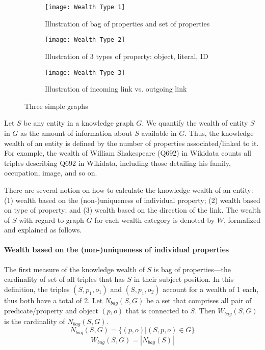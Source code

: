 \begin{figure}
     \centering
     \begin{subfigure}[b]{0.3\textwidth}
         \centering
         \texttt{[image: Wealth Type 1]}
         \caption{Illustration of bag of properties and set of properties}
         \label{fig:wealth-type1}
     \end{subfigure}
     \hfill
     \begin{subfigure}[b]{0.3\textwidth}
         \centering
         \texttt{[image: Wealth Type 2]}
         \caption{Illustration of 3 types of property: object, literal, ID}
         \label{fig:wealth-type2}
     \end{subfigure}
     \hfill
     \begin{subfigure}[b]{0.3\textwidth}
         \centering
         \texttt{[image: Wealth Type 3]}
         \caption{Illustration of incoming link vs. outgoing link}
         \label{fig:wealth-type3}
     \end{subfigure}
     \caption{Three simple graphs}
     \label{fig:three graphs}
\end{figure}

Let \(S\) be any entity in a knowledge graph \(G\). We quantify the wealth of entity \(S\) in \(G\) as the amount of information about \(S\) available in \(G\). Thus, the knowledge wealth of an entity is defined by the number of properties associated/linked to it. For example, the wealth of William Shakespeare (Q692) in Wikidata counts all triples describing Q692 in Wikidata, including those detailing his family, occupation, image, and so on.

There are several notion on how to calculate the knowledge wealth of an entity: (1) wealth based on the (non-)uniqueness of individual property; (2) wealth based on type of property; and (3) wealth based on the direction of the link. The wealth of \(S\) with regard to graph \(G\) for each wealth category is denoted by \(W\), formalized and explained as follows.

\paragraph{Wealth based on the (non-)uniqueness of individual properties}
The first measure of the knowledge wealth of \(S\) is bag of properties---the cardinality of set of all triples that has \(S\) in their subject position. In this definition, the triples \((S, p_1, o_1)\) and \((S, p_1, o_2)\) account for a wealth of 1 each, thus both have a total of 2.
Let \(N_{bag}(S,G)\) be a set that comprises all pair of predicate/property and object \((p,o)\) that is connected to \(S\). Then \(W_{bag}(S, G)\) is the cardinality of \(N_{bag}(S,G)\).
\[
    N_{bag}(S,G) = \{(p, o) | (S, p, o) \in G\}
\]
\[
    W_{bag}(S,G) = |N_{bag}(S)|
\]

